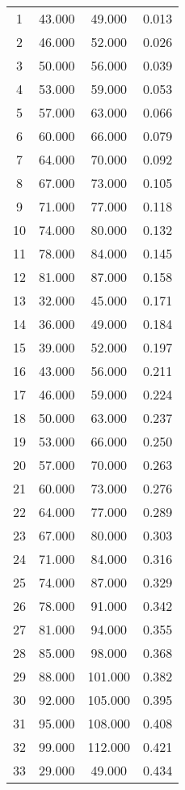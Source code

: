 % 
\begin{tabular}{cccc}
  \hline
  \hline
1 & 43.000 & 49.000 & 0.013 \\ 
  2 & 46.000 & 52.000 & 0.026 \\ 
  3 & 50.000 & 56.000 & 0.039 \\ 
  4 & 53.000 & 59.000 & 0.053 \\ 
  5 & 57.000 & 63.000 & 0.066 \\ 
  6 & 60.000 & 66.000 & 0.079 \\ 
  7 & 64.000 & 70.000 & 0.092 \\ 
  8 & 67.000 & 73.000 & 0.105 \\ 
  9 & 71.000 & 77.000 & 0.118 \\ 
  10 & 74.000 & 80.000 & 0.132 \\ 
  11 & 78.000 & 84.000 & 0.145 \\ 
  12 & 81.000 & 87.000 & 0.158 \\ 
  13 & 32.000 & 45.000 & 0.171 \\ 
  14 & 36.000 & 49.000 & 0.184 \\ 
  15 & 39.000 & 52.000 & 0.197 \\ 
  16 & 43.000 & 56.000 & 0.211 \\ 
  17 & 46.000 & 59.000 & 0.224 \\ 
  18 & 50.000 & 63.000 & 0.237 \\ 
  19 & 53.000 & 66.000 & 0.250 \\ 
  20 & 57.000 & 70.000 & 0.263 \\ 
  21 & 60.000 & 73.000 & 0.276 \\ 
  22 & 64.000 & 77.000 & 0.289 \\ 
  23 & 67.000 & 80.000 & 0.303 \\ 
  24 & 71.000 & 84.000 & 0.316 \\ 
  25 & 74.000 & 87.000 & 0.329 \\ 
  26 & 78.000 & 91.000 & 0.342 \\ 
  27 & 81.000 & 94.000 & 0.355 \\ 
  28 & 85.000 & 98.000 & 0.368 \\ 
  29 & 88.000 & 101.000 & 0.382 \\ 
  30 & 92.000 & 105.000 & 0.395 \\ 
  31 & 95.000 & 108.000 & 0.408 \\ 
  32 & 99.000 & 112.000 & 0.421 \\ 
  33 & 29.000 & 49.000 & 0.434 \\ 

\end{tabular}
